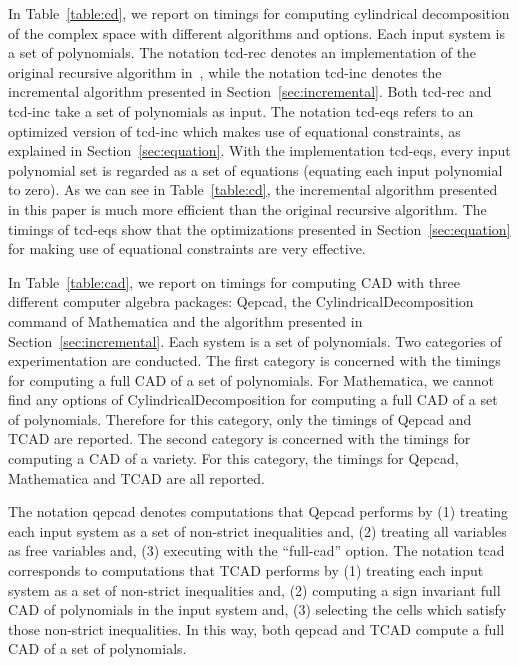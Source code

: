 \documentclass[10pt]{article}
\newcommand{\TCAD}{{\sc TCAD}}
\newcommand{\CAD}{{CAD}}
\newcommand{\QEPCAD}{{\sc Qepcad}}
\begin{document}
In Table~\ref{table:cd}, we report on timings 
for computing cylindrical decomposition of the complex space
with different algorithms and options.
Each input system is a set of polynomials.
The notation tcd-rec denotes an 
implementation of the original recursive algorithm in~\cite{CMXY09},
while the notation tcd-inc denotes the incremental algorithm
presented in Section~\ref{sec:incremental}.
Both  tcd-rec and tcd-inc take a set of polynomials as input. 
The notation tcd-eqs refers to an optimized version of 
tcd-inc which makes use of equational constraints, as 
explained in Section~\ref{sec:equation}.
With the implementation tcd-eqs, every input polynomial set
is regarded as a set of equations (equating each input polynomial
to zero).
As we can see in Table~\ref{table:cd}, the incremental algorithm presented 
in this paper is much more efficient than the original recursive algorithm. 
The timings of tcd-eqs show that the optimizations
presented in Section~\ref{sec:equation}
for making use of equational constraints are very effective.


In Table~\ref{table:cad}, we report on timings 
for computing {\CAD} with three different computer algebra
packages: {\QEPCAD}, the {\sf CylindricalDecomposition} command 
of {\sf Mathematica} and the algorithm
presented in Section~\ref{sec:incremental}.
Each system is a set of polynomials.
Two categories of experimentation are conducted.
The first category is concerned with the timings 
for computing a full {\CAD} of a set of polynomials.
For {\sf Mathematica}, we cannot find
any options of {\sf CylindricalDecomposition} 
for computing a full {\CAD} of a set of 
polynomials.
Therefore for this category, 
only the timings of {\QEPCAD} and {\TCAD} are reported.
The second category is concerned with 
the timings for computing a {\CAD} of a variety.
For this category, the timings for {\QEPCAD}, {\sf Mathematica}
and {\sf TCAD} are all reported.


The notation qepcad denotes computations 
that {\QEPCAD} performs by (1) treating each input system as a set of 
non-strict inequalities and, (2) treating all variables as free 
variables and, (3) executing with the ``full-cad'' option.
The notation tcad corresponds to computations that {\TCAD}
performs by (1) treating each input system as a set of 
non-strict inequalities and,
(2) computing a sign invariant full {\CAD} of 
polynomials in the input system and, 
(3) selecting the cells which satisfy those non-strict inequalities. 
In this way, both qepcad and {\TCAD} compute a full {\CAD} of a set of 
polynomials.
\end{document}
